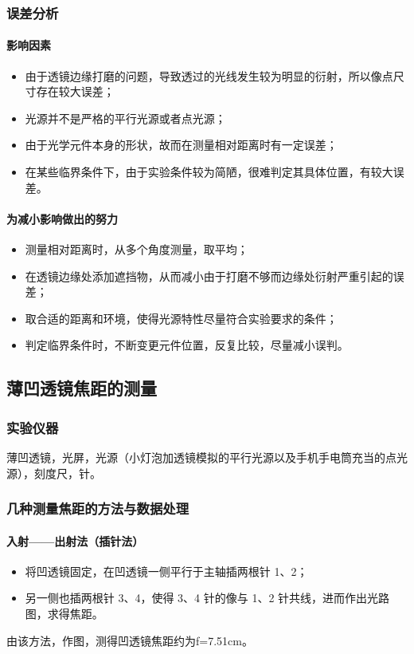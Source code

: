 \documentclass[UTF8]{ctexart}
\begin{document}
\subsubsection{误差分析}
\paragraph{影响因素}
\begin{itemize}
\item 由于透镜边缘打磨的问题，导致透过的光线发生较为明显的衍射，所以像点尺寸存在较大误差；
\item 光源并不是严格的平行光源或者点光源；
\item 由于光学元件本身的形状，故而在测量相对距离时有一定误差；
\item 在某些临界条件下，由于实验条件较为简陋，很难判定其具体位置，有较大误差。
\end{itemize}
\paragraph{为减小影响做出的努力}
\begin{itemize}
\item 测量相对距离时，从多个角度测量，取平均；
\item 在透镜边缘处添加遮挡物，从而减小由于打磨不够而边缘处衍射严重引起的误差；
\item 取合适的距离和环境，使得光源特性尽量符合实验要求的条件；
\item 判定临界条件时，不断变更元件位置，反复比较，尽量减小误判。
\end{itemize}
\subsection{薄凹透镜焦距的测量}
\subsubsection{实验仪器}
薄凹透镜，光屏，光源（小灯泡加透镜模拟的平行光源以及手机手电筒充当的点光源），刻度尺，针。
\subsubsection{几种测量焦距的方法与数据处理}
\paragraph{入射——出射法（插针法）}
\begin{itemize}
\item 将凹透镜固定，在凹透镜一侧平行于主轴插两根针 1、2；
\item 另一侧也插两根针 3、4，使得 3、4 针的像与 1、2 针共线，进而作出光路图，求得焦距。
\end{itemize}
由该方法，作图，测得凹透镜焦距约为f=7.51cm。
\end{document}
